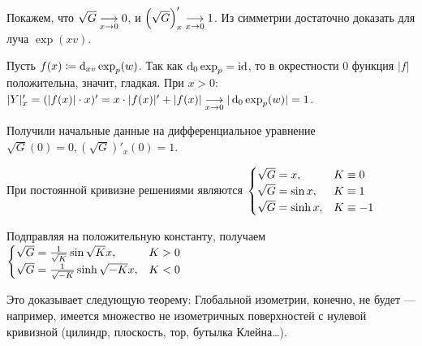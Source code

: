 \documentclass[a4paper]{report}
\begin{document}
    Покажем, что $\sqrt{G} \underset{x \to 0}{\longrightarrow} 0$, и $\left(\sqrt{G}\right)'_{x} \underset{x \to 0}{\longrightarrow} 1$.
    Из симметрии достаточно доказать для луча $\exp(x{v})$.

    Пусть $f(x) \coloneqq \operatorname{d}\!_{xv}\exp_p(w)$.
    Так как $\operatorname{d}\!_0 \exp_p = \operatorname{id}$, то в окрестности $0$ функция $|f|$ положительна, значит, гладкая.
    При $x > 0$: $|Y|'_{x} = (|f(x)| \cdot x)'= x \cdot |f(x)|' + |f(x)| \underset{x \to 0}{\longrightarrow} |\operatorname{d}\!_0\exp_p(w)| = 1$.

    Получили начальные данные на дифференциальное уравнение $\sqrt{G}(0) = 0, \left(\sqrt{G}\right)'_x(0) = 1$.

    При постоянной кривизне решениями являются $\begin{cases}\sqrt{G} = x, & K \equiv 0 \\ \sqrt{G} = \sin x, & K \equiv 1 \\ \sqrt{G} = \sinh x, & K \equiv -1\end{cases}$

    Подправляя на положительную константу, получаем $\begin{cases}\sqrt{G} = \frac{1}{\sqrt{K}}\sin\sqrt{K} x, & K > 0  \\ \sqrt{G} = \frac{1}{\sqrt{-K}}\sinh \sqrt{-K}x, & K < 0\end{cases}$

    Это доказывает следующую теорему:
    Глобальной изометрии, конечно, не будет --- например, имеется множество не изометричных поверхностей с нулевой кривизной (цилиндр, плоскость, тор, бутылка Клейна\dots).
\end{document}
